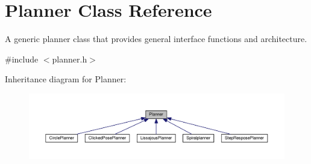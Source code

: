 \hypertarget{classPlanner}{}\section{Planner Class Reference}
\label{classPlanner}


A generic planner class that provides general interface functions and architecture.  




{\ttfamily \#include $<$planner.\+h$>$}



Inheritance diagram for Planner\+:\nopagebreak
\begin{figure}[H]
\begin{center}
\leavevmode
\includegraphics[width=350pt]{d0/de4/classPlanner__inherit__graph}
\end{center}
\end{figure}
